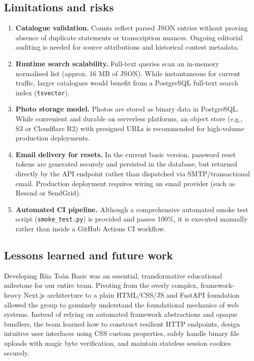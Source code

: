 \subsection{Limitations and risks}\label{sec:limits}
\begin{enumerate}[label=L\arabic*.]
  \item \textbf{Catalogue validation.} Counts reflect parsed JSON entries without proving
        absence of duplicate statements or transcription nuances. Ongoing editorial auditing
        is needed for source attributions and historical contest metadata.
  \item \textbf{Runtime search scalability.} Full-text queries scan an in-memory normalised
        list (approx. 16 MB of JSON). While instantaneous for current traffic, larger catalogues
        would benefit from a PostgreSQL full-text search index (\texttt{tsvector}).
  \item \textbf{Photo storage model.} Photos are stored as binary data in PostgreSQL. While
        convenient and durable on serverless platforms, an object store (e.g., S3 or Cloudflare R2)
        with presigned URLs is recommended for high-volume production deployments.
  \item \textbf{Email delivery for resets.} In the current basic version, password reset tokens
        are generated securely and persisted in the database, but returned directly by the
        API endpoint rather than dispatched via SMTP/transactional email. Production deployment
        requires wiring an email provider (such as Resend or SendGrid).
  \item \textbf{Automated CI pipeline.} Although a comprehensive automated smoke test script
        (\texttt{smoke\_test.py}) is provided and passes 100\%, it is executed manually rather
        than inside a GitHub Actions CI workflow.
\end{enumerate}

\subsection{Lessons learned and future work}
Developing Rùa Toán Basic was an essential, transformative educational milestone for our entire team.
Pivoting from the overly complex, framework-heavy Next.js architecture to a plain HTML/CSS/JS and
FastAPI foundation allowed the group to genuinely understand the foundational mechanics of web systems.
Instead of relying on automated framework abstractions and opaque bundlers, the team learned how to
construct resilient HTTP endpoints, design intuitive user interfaces using CSS custom properties,
safely handle binary file uploads with magic byte verification, and maintain stateless session cookies securely.

